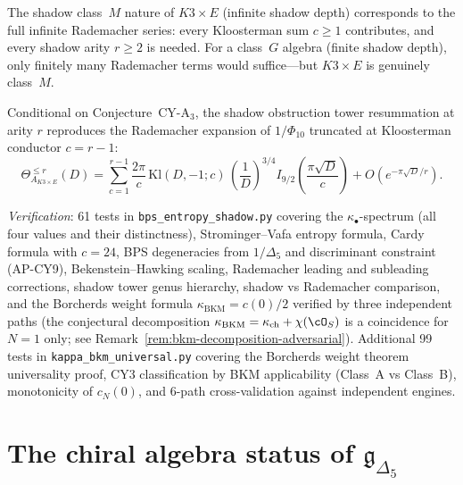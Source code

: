 \noindent The shadow class~$M$ nature of $K3 \times E$ (infinite shadow depth) corresponds to the full infinite Rademacher series: every Kloosterman sum $c \geq 1$ contributes, and every shadow arity $r \geq 2$ is needed. For a class~$G$ algebra (finite shadow depth), only finitely many Rademacher terms would suffice---but $K3 \times E$ is genuinely class~$M$.

\begin{conjecture}
\label{conj:k3e-shadow-rademacher}
\ClaimStatusConjectured
Conditional on Conjecture~CY-A$_3$, the shadow obstruction tower resummation at arity $r$ reproduces the Rademacher expansion of $1/\Phi_{10}$ truncated at Kloosterman conductor $c = r - 1$:
\[
 \Theta^{\leq r}_{A_{K3 \times E}}(D)
 = \sum_{c=1}^{r-1} \frac{2\pi}{c}\,\mathrm{Kl}(D, -1; c)\, \left(\frac{1}{D}\right)^{3/4} I_{9/2}\!\left(\frac{\pi\sqrt{D}}{c}\right)
 + O(e^{-\pi\sqrt{D}/r}).
\]
\end{conjecture}

\noindent\textit{Verification}: 61 tests in \texttt{bps\_entropy\_shadow.py} covering the $\kappa_\bullet$-spectrum (all four values and their distinctness), Strominger--Vafa entropy formula, Cardy formula with $c = 24$, BPS degeneracies from $1/\Delta_5$ and discriminant constraint (AP-CY9), Bekenstein--Hawking scaling, Rademacher leading and subleading corrections, shadow tower genus hierarchy, shadow vs Rademacher comparison, and the Borcherds weight formula $\kappa_{\mathrm{BKM}} = c(0)/2$ verified by three independent paths (the conjectural decomposition $\kappa_{\mathrm{BKM}} = \kappa_{\mathrm{ch}} + \chi(\cO_S)$ is a coincidence for $N = 1$ only; see Remark~\ref{rem:bkm-decomposition-adversarial}).  Additional 99 tests in \texttt{kappa\_bkm\_universal.py} covering the Borcherds weight theorem universality proof, CY3 classification by BKM applicability (Class~A vs Class~B), monotonicity of $c_N(0)$, and 6-path cross-validation against independent engines.


\section{The chiral algebra status of $\mathfrak{g}_{\Delta_5}$}
\label{sec:k3e-bkm-chiral-status}

